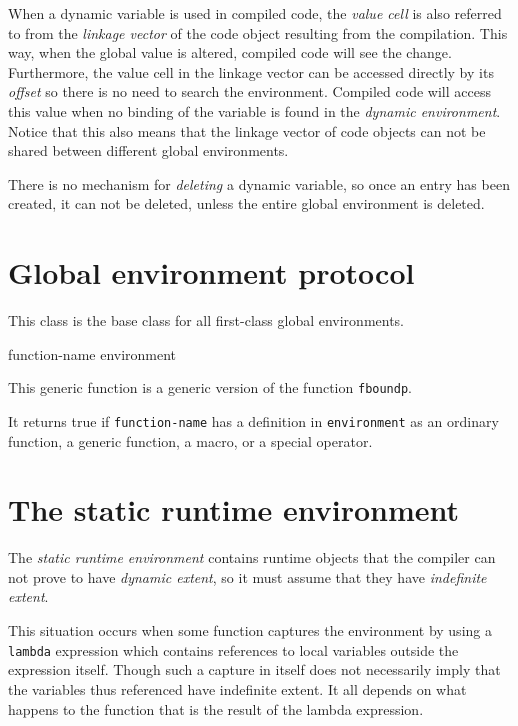 When a dynamic variable is used in compiled code, the \emph{value
  cell} is also referred to from the \emph{linkage vector} of the code
object resulting from the compilation.  This way, when the global
value is altered, compiled code will see the change.  Furthermore, the
value cell in the linkage vector can be accessed directly by its
\emph{offset} so there is no need to search the environment.  Compiled
code will access this value when no binding of the variable is found
in the \emph{dynamic environment}.  Notice that this also means that
the linkage vector of code objects can not be shared between different
global environments.

There is no mechanism for \emph{deleting} a dynamic variable, so once
an entry has been created, it can not be deleted, unless the entire
global environment is deleted. 

\section{Global environment protocol}
\label{sec-environments-global-environment-protocol}


This class is the base class for all first-class global environments.

 {function-name environment}

This generic function is a generic version of the \commonlisp{}
function \texttt{fboundp}.

It returns true if \texttt{function-name} has a definition in
\texttt{environment} as an ordinary function, a generic function, a
macro, or a special operator.

\section{The static runtime environment}
\label{sec-environments-static-runtime}

The \emph{static runtime environment} contains runtime objects that
the compiler can not prove to have \emph{dynamic extent}, so it must
assume that they have \emph{indefinite extent}.  

This situation occurs when some function captures the environment by
using a \texttt{lambda} expression which contains references to local
variables outside the expression itself.  Though such a capture in
itself does not necessarily imply that the variables thus referenced
have indefinite extent.  It all depends on what happens to the
function that is the result of the lambda expression.  

